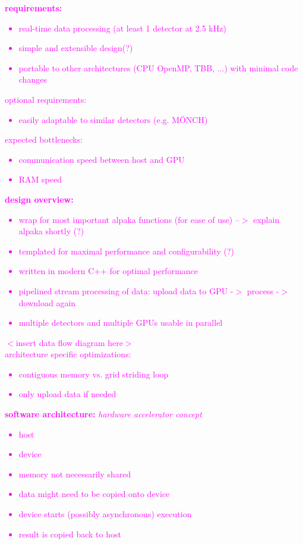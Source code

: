 \documentclass[a4paper]{article}
\begin{document}
\textcolor{magenta}{
\textbf{requirements:}
\begin{itemize}
	\item real-time data processing (at least 1 detector at 2.5 kHz)
	\item simple and extensible design(?)
	\item portable to other architectures (CPU OpenMP, TBB, ...) with minimal code changes
\end{itemize}
optional requirements:
\begin{itemize}
	\item easily adaptable to similar detectors (e.g. MÖNCH)
\end{itemize}
expected bottlenecks:
\begin{itemize}
	\item communication speed between host and GPU
	\item RAM speed
\end{itemize}
\textbf{design overview:}
\begin{itemize}
	\item wrap for most important alpaka functions (for ease of use) --$>$ explain alpaka shortly (?)
	\item templated for maximal performance and configurability (?)
	\item written in modern C++ for optimal performance
	\item pipelined stream processing of data: upload data to GPU -$>$ process -$>$ download again
	\item multiple detectors and multiple GPUs usable in parallel
\end{itemize}
$<$insert data flow diagram here$>$ \\
architecture specific optimizations:
\begin{itemize}
	\item contiguous memory vs. grid striding loop
	\item only upload data if needed
\end{itemize}
\textbf{software architecture:}
\textit{hardware accelerator concept}
\begin{itemize}
	\item host
	\item device
	\item memory not necessarily shared
	\item data might need to be copied onto device
	\item device starts (possibly asynchronous) execution
	\item result is copied back to host

\end{itemize}}
\end{document}
